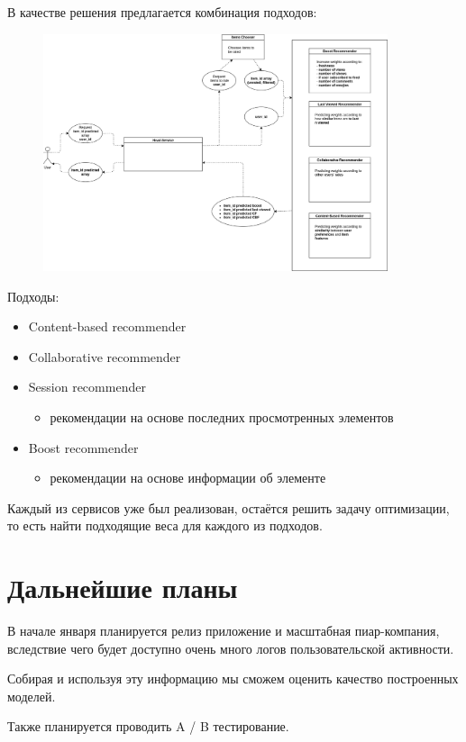 \documentclass[14pt]{matmex-diploma-custom}
\begin{document}
В качестве решения предлагается комбинация подходов:

\begin{figure}[h]
	\includegraphics[width=0.9\textwidth]{./images/main.png}
	\centering
\end{figure}

Подходы:

\begin{itemize}
	\item Content-based recommender
	\item Collaborative recommender
	\item Session recommender
	      \begin{itemize}
		      \item рекомендации на основе последних просмотренных элементов
	      \end{itemize}
	\item Boost recommender
	      \begin{itemize}
		      \item рекомендации на основе информации об элементе
	      \end{itemize}
\end{itemize}

Каждый из сервисов уже был реализован, остаётся решить задачу оптимизации, то есть найти подходящие веса для каждого из подходов.

\section{Дальнейшие планы}

В начале января планируется релиз приложение и масштабная пиар-компания, вследствие чего будет доступно очень много логов пользовательской активности.

Собирая и используя эту информацию мы сможем оценить качество построенных моделей.

Также планируется проводить A / B тестирование.


\setmonofont[Mapping=tex-text]{CMU Typewriter Text}


\end{document}
